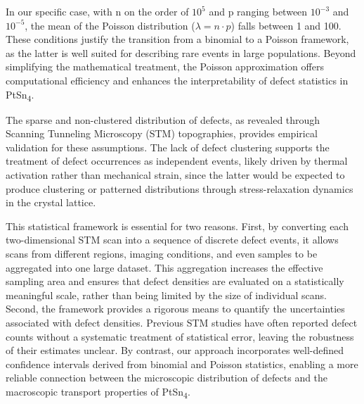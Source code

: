 \par In our specific case, with n on the order of $10^5$ and p ranging between $10^{-3}$ and $10^{-5}$, the mean of the Poisson distribution ($\lambda=n\cdot p$) falls between 1 and 100. These conditions justify the transition from a binomial to a Poisson framework, as the latter is well suited for describing rare events in large populations. Beyond simplifying the mathematical treatment, the Poisson approximation offers computational efficiency and enhances the interpretability of defect statistics in PtSn\textsubscript{4}.
\par The sparse and non-clustered distribution of defects, as revealed through Scanning Tunneling Microscopy (STM) topographies, provides empirical validation for these assumptions. The lack of defect clustering supports the treatment of defect occurrences as independent events, likely driven by thermal activation rather than mechanical strain, since the latter would be expected to produce clustering or patterned distributions through stress-relaxation dynamics in the crystal lattice.

This statistical framework is essential for two reasons. First, by converting each two-dimensional STM scan into a sequence of discrete defect events, it allows scans from different regions, imaging conditions, and even samples to be aggregated into one large dataset. This aggregation increases the effective sampling area and ensures that defect densities are evaluated on a statistically meaningful scale, rather than being limited by the size of individual scans. Second, the framework provides a rigorous means to quantify the uncertainties associated with defect densities. Previous STM studies have often reported defect counts without a systematic treatment of statistical error, leaving the robustness of their estimates unclear\cite{daiIntrinsicLimitTopological2016,alpichshevSTMImagingImpurity2012,mcelroyAtomicScaleSourcesMechanism2005}. By contrast, our approach incorporates well-defined confidence intervals derived from binomial and Poisson statistics, enabling a more reliable connection between the microscopic distribution of defects and the macroscopic transport properties of PtSn\textsubscript{4}.

